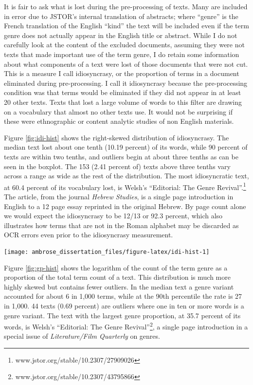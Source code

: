 \documentclass[]{book}
\let\rmarkdownfootnote\footnote%
\def\footnote{\protect\rmarkdownfootnote}
\theoremstyle{definition}
\theoremstyle{definition}
\theoremstyle{definition}
\theoremstyle{remark}
\begin{document}
It is fair to ask what is lost during the pre-processing of texts. Many
are included in error due to JSTOR's internal translation of abstracts;
where ``genre'' is the French translation of the English ``kind'' the
text will be included even if the term genre does not actually appear in
the English title or abstract. While I do not carefully look at the
content of the excluded documents, assuming they were not texts that
made important use of the term genre, I do retain some information about
what components of a text were lost of those documents that were not
cut. This is a measure I call idiosyncrasy, or the proportion of terms
in a document eliminated during pre-processing. I call it idiosyncrasy
because the pre-processing condition was that terms would be eliminated
if they did not appear in at least 20 other texts. Texts that lost a
large volume of words to this filter are drawing on a vocabulary that
almost no other texts use. It would not be surprising if these were
ethnographic or content analytic studies of non English materials.

Figure \ref{fig:idi-hist} shows the right-skewed distribution of
idiosyncrasy. The median text lost about one tenth (10.19 percent) of
its words, while 90 percent of texts are within two tenths, and outliers
begin at about three tenths as can be seen in the boxplot. The 153 (2.41
percent of) texts above three tenths vary across a range as wide as the
rest of the distribution. The most idiosyncratic text, at 60.4 percent
of its vocabulary lost, is Welsh's ``Editorial: The Genre
Revival''.\footnote{www.jstor.org/stable/10.2307/27909026} The article,
from the journal \emph{Hebrew Studies}, is a single page introduction in
English to a 12 page essay reprinted in the original Hebrew. By page
count alone we would expect the idiosyncrasy to be 12/13 or 92.3
percent, which also illustrates how terms that are not in the Roman
alphabet may be discarded as OCR errors even prior to the idiosyncrasy
measurement.

\begin{center}\texttt{[image: ambrose\_dissertation\_files/figure-latex/idi-hist-1]} \end{center}

Figure \ref{fig:gp-hist} shows the logarithm of the count of the term
genre as a proportion of the total term count of a text. This
distribution is much more highly skewed but contains fewer outliers. In
the median text a genre variant accounted for about 6 in 1,000 terms,
while at the 90th percentile the rate is 27 in 1,000. 44 texts (0.69
percent) are outliers where one in ten or more words is a genre variant.
The text with the largest genre proportion, at 35.7 percent of its
words, is Welsh's ``Editorial: The Genre Revival''\footnote{www.jstor.org/stable/10.2307/43795866},
a single page introduction in a special issue of \emph{Literature/Film
Quarterly} on genres.
\end{document}
